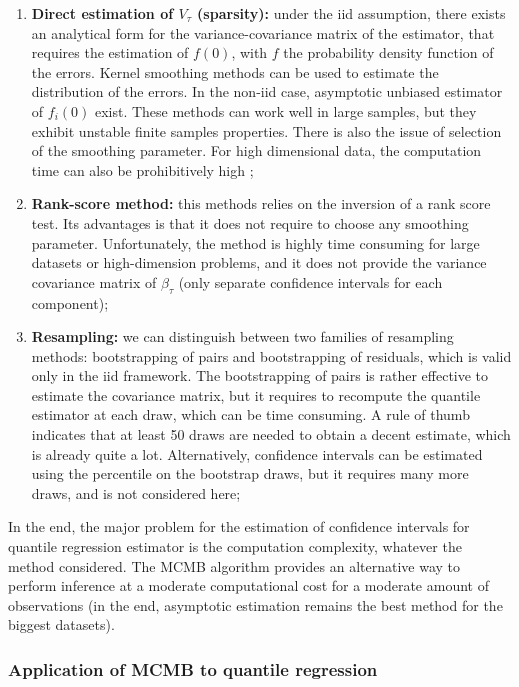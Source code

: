\documentclass[11pt]{article}
\begin{document}
	\begin{enumerate}
		\item \textbf{Direct estimation of $V_{\tau}$ (sparsity):} under the iid assumption, there exists an analytical form for the variance-covariance matrix of the estimator, that requires the estimation of $f(0)$, with $f$ the probability density function of the errors. Kernel smoothing methods can be used to estimate the distribution of the errors. In the non-iid case, asymptotic unbiased estimator of $f_{i}(0)$ exist. These methods can work well in large samples, but they exhibit unstable finite samples properties. There is also the issue of selection of the smoothing parameter. For high dimensional data, the computation time can also be prohibitively high ;
		
		\item \textbf{Rank-score method:} this methods relies on the inversion of a rank score test. Its advantages is that it does not require to choose any smoothing parameter. Unfortunately, the method is highly time consuming for large datasets or high-dimension problems, and it does not provide the variance covariance matrix of $\beta_{\tau}$ (only separate confidence intervals for each component);
		
		\item \textbf{Resampling:} we can distinguish between two families of resampling methods: bootstrapping of pairs and bootstrapping of residuals, which is valid only in the iid framework. The bootstrapping of pairs is rather effective to estimate the covariance matrix, but it requires to recompute the quantile estimator at each draw, which can be time consuming. A rule of thumb indicates that at least 50 draws are needed to obtain a decent estimate, which is already quite a lot. Alternatively, confidence intervals can be estimated using the  percentile on the bootstrap draws, but it requires many more draws, and is not considered here;
	\end{enumerate}


In the end, the major problem for the estimation of confidence intervals for quantile regression estimator is the computation complexity, whatever the method considered. The MCMB algorithm provides an alternative way to perform inference at a moderate computational cost for a moderate amount of observations (in the end, asymptotic estimation remains the best method for the biggest datasets).
	
	
		
		\subsubsection{Application of MCMB to quantile regression}
\end{document}
